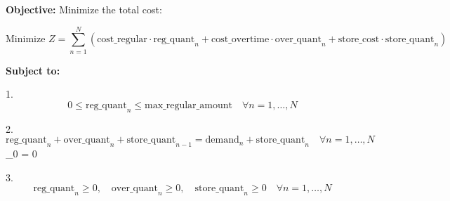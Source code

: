 \documentclass{article}
\begin{document}
\textbf{Objective:}
Minimize the total cost:

\[
\text{Minimize } Z = \sum_{n=1}^{N} \left( \text{cost\_regular} \cdot \text{reg\_quant}_{n} + \text{cost\_overtime} \cdot \text{over\_quant}_{n} + \text{store\_cost} \cdot \text{store\_quant}_{n} \right)
\]

\textbf{Subject to:}

1. 
\[
0 \leq \text{reg\_quant}_{n} \leq \text{max\_regular\_amount} \quad \forall n = 1, \ldots, N
\]

2. 
\[
\text{reg\_quant}_{n} + \text{over\_quant}_{n} + \text{store\_quant}_{n-1} = \text{demand}_{n} + \text{store\_quant}_{n} \quad \forall n = 1, \ldots, N
\]
 _{0} = 0 

3. 
\[
\text{reg\_quant}_{n} \geq 0, \quad \text{over\_quant}_{n} \geq 0, \quad \text{store\_quant}_{n} \geq 0 \quad \forall n = 1, \ldots, N
\]
\end{document}
